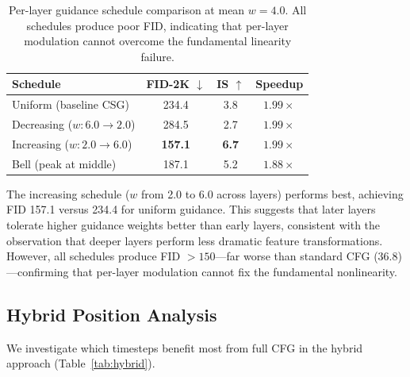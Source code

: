\documentclass{article}
\begin{document}
\begin{table}[t]
\caption{Per-layer guidance schedule comparison at mean $w = 4.0$. All schedules produce poor FID, indicating that per-layer modulation cannot overcome the fundamental linearity failure.}
\label{tab:perlayer}
\centering\small
\begin{tabular}{lccc}
\toprule
Schedule & FID-2K $\downarrow$ & IS $\uparrow$ & Speedup \\
\midrule
Uniform (baseline CSG) & 234.4 & 3.8 & $1.99\times$ \\
Decreasing ($w: 6.0 \to 2.0$) & 284.5 & 2.7 & $1.99\times$ \\
Increasing ($w: 2.0 \to 6.0$) & \textbf{157.1} & \textbf{6.7} & $1.99\times$ \\
Bell (peak at middle) & 187.1 & 5.2 & $1.88\times$ \\
\bottomrule
\end{tabular}
\end{table}

The increasing schedule ($w$ from 2.0 to 6.0 across layers) performs best, achieving FID 157.1 versus 234.4 for uniform guidance. This suggests that later layers tolerate higher guidance weights better than early layers, consistent with the observation that deeper layers perform less dramatic feature transformations. However, all schedules produce FID $> 150$---far worse than standard CFG (36.8)---confirming that per-layer modulation cannot fix the fundamental nonlinearity.

\subsection{Hybrid Position Analysis}

We investigate which timesteps benefit most from full CFG in the hybrid approach (Table~\ref{tab:hybrid}).
\end{document}
